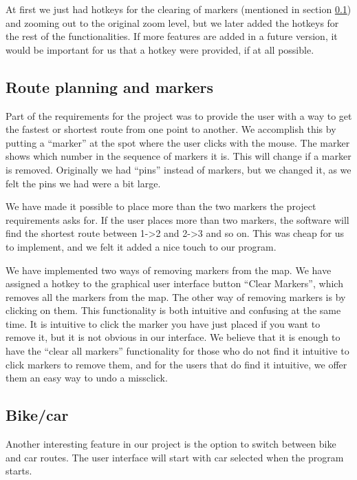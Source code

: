 At first we just had hotkeys for the clearing of markers (mentioned in section
\ref{UIA-IF-M}) and zooming out to the original zoom level, but we later added
the hotkeys for the rest of the functionalities. If more features are added in a
future version, it would be important for us that a hotkey were provided, if at
all possible.

\subsection{Route planning and markers}
\label{UIA-IF-M}
Part of the requirements for the project was to provide the user with a way to
get the fastest or shortest route from one point to another. We accomplish this
by putting a ``marker'' at the spot where the user clicks with the mouse. The
marker shows which number in the sequence of markers it is. This will change 
if a marker is removed. Originally we had ``pins'' instead of markers, but we 
changed it, as we felt the pins we had were a bit large.

We have made it possible to place more than the two markers the project
requirements asks for. If the user places more than two markers, the software
will find the shortest route between 1-\textgreater 2 and 2-\textgreater 3 and
so on. This was cheap for us to implement, and we felt it added a nice touch to our program. 

We have implemented two ways of removing markers from the map. We have assigned
a hotkey to the graphical user interface button ``Clear Markers'', which removes 
all the markers from the map. The other way of removing markers is by clicking
on them. This functionality is both intuitive and confusing at the same time. It is
intuitive to click the marker you have just placed if you want to remove it, but
it is not obvious in our interface. We believe that it is enough to have the
``clear all markers'' functionality for those who do not find it intuitive to
click markers to remove them, and for the users that do find it intuitive, we
offer them an easy way to undo a missclick.

\subsection{Bike/car}
\label{UIA-IF-BC}
Another interesting feature in our  project is the option
to switch between bike and car routes. The user interface will start with car
selected when the program starts.

